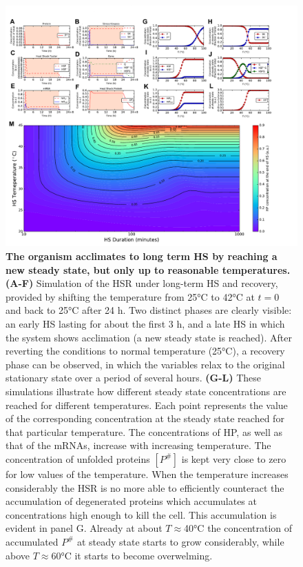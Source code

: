 \documentclass[oneside, 10pt, a4paper, twocolumn]{article}
\begin{document}
\begin{figure}
\centering
\includegraphics[width=\textwidth]{Figure8_SupMat.pdf}
\caption{\small{\textbf{The organism {acclimates} to long term HS by reaching a new steady state, but only up to reasonable temperatures.} \textbf{(A-F)} Simulation of the HSR under long-term HS and recovery, provided by shifting the temperature from 25°C to 42°C at $t=0$ and back to 25°C after 24 h. Two distinct phases are clearly visible: an early HS lasting for about the first $3$ h, and a late HS in which the system shows {acclimation} (a new steady state is reached). 
After reverting the conditions to normal temperature (25°C), a recovery phase can be observed, in which
the variables relax to the original stationary state over a period of several hours. \textbf{(G-L)} These simulations illustrate how different steady state concentrations are reached for different temperatures. Each point represents the value of the corresponding concentration at the steady state reached for that particular temperature. The concentrations of HP, as well as that of the mRNAs, increase with increasing temperature. The concentration of unfolded proteins $\left[P^\#\right]$ is kept very close to zero for low values of the temperature. When the temperature increases considerably the HSR is no more able to efficiently counteract the accumulation of degenerated proteins which accumulates at concentrations high enough to kill the cell. This accumulation is evident in panel G. Already at about $T \approx $40°C the concentration of accumulated $P^{\#}$ at steady state starts to grow considerably, while above $T \approx $60°C it starts to become overwelming.
}}
\end{figure}
\end{document}
